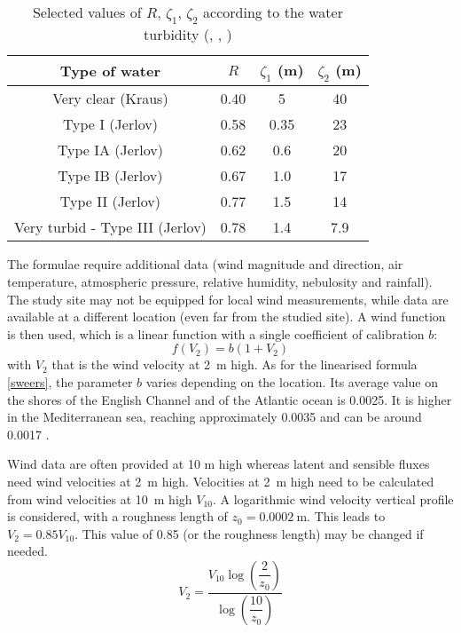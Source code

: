 \begin{table}[ptbh]
\caption{Selected values of $R$, $\zeta_{1}$, $\zeta_{2}$
  according to the water turbidity (\cite{paulson_irradiance_1977},
  \cite{jerlov_optical_1968}, \cite{kraus_atmos_1972})}%
\label{jerlov}%
\centering
\begin{tabular}
[c]{|c|c|c|c|}\hline
Type of water & $R$ & $\zeta_{1}$ (m) & $\zeta_{2}$ (m)\\\hline
Very clear (Kraus) & 0.40 & 5 & 40\\\hline
Type I (Jerlov) & 0.58 & 0.35 & 23\\\hline
Type IA (Jerlov) & 0.62 & 0.6 & 20\\\hline
Type IB (Jerlov) & 0.67 & 1.0 & 17\\\hline
Type II (Jerlov) & 0.77 & 1.5 & 14\\\hline
Very turbid - Type III (Jerlov) & 0.78 & 1.4 & 7.9\\\hline
\end{tabular}
\end{table}

The formulae require additional data (wind magnitude and direction,
air temperature, atmospheric pressure, relative humidity, nebulosity and rainfall).
The study site may not be equipped for local wind measurements,
while data are available at a different location (even far from the studied
site). A wind function is then used, which is a linear function with a single
coefficient of calibration $b$:
\begin{equation}
f(V_2) = b(1+V_2)
\end{equation}
with $V_2$ that is the wind velocity at 2~m high. As for the linearised
formula \eqref{sweers}, the parameter $b$ varies depending on the location. Its
average value on the shores of the English Channel and of the Atlantic ocean is 0.0025. It
is higher in the Mediterranean sea, reaching approximately 0.0035 and can
be around 0.0017 \cite{salencon_lac_1997}.

Wind data are often provided at 10 m high whereas latent and sensible fluxes
need wind velocities at 2~m high. Velocities at 2~m high need to be calculated
from wind velocities at 10~m high $V_{10}$. A logarithmic wind velocity vertical profile is
considered, with a roughness length of $z_{0} =
0.0002~\mathrm{{m}}$. This leads to $V_{2} = 0.85 V_{10}$. This value
of 0.85 (or the roughness length) may be changed if needed.
\begin{equation}
V_{2} = \dfrac{V_{10}\log\left(\dfrac{2}{z_{0}}\right)}{\log\left(\dfrac{10}{z_{0}}\right)}%
\end{equation}


